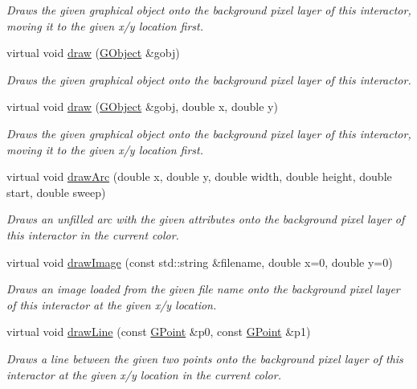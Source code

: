 \begin{DoxyCompactItemize}
\begin{DoxyCompactList}\small\item\em Draws the given graphical object onto the background pixel layer of this interactor, moving it to the given x/y location first. \end{DoxyCompactList}\item 
virtual void \mbox{\hyperlink{classGDrawingSurface_a022a8d51c7fabcd79a0c809233e93453}{draw}} (\mbox{\hyperlink{classGObject}{G\+Object}} \&gobj)
\begin{DoxyCompactList}\small\item\em Draws the given graphical object onto the background pixel layer of this interactor. \end{DoxyCompactList}\item 
virtual void \mbox{\hyperlink{classGDrawingSurface_a8af8762bd6720e0a1d2a84b190e3dc96}{draw}} (\mbox{\hyperlink{classGObject}{G\+Object}} \&gobj, double x, double y)
\begin{DoxyCompactList}\small\item\em Draws the given graphical object onto the background pixel layer of this interactor, moving it to the given x/y location first. \end{DoxyCompactList}\item 
virtual void \mbox{\hyperlink{classGDrawingSurface_a38b6fae1045191c57092b49905068144}{draw\+Arc}} (double x, double y, double width, double height, double start, double sweep)
\begin{DoxyCompactList}\small\item\em Draws an unfilled arc with the given attributes onto the background pixel layer of this interactor in the current color. \end{DoxyCompactList}\item 
virtual void \mbox{\hyperlink{classGDrawingSurface_abdd4cb1f2c64adc5d03522a1ee30febf}{draw\+Image}} (const std\+::string \&filename, double x=0, double y=0)
\begin{DoxyCompactList}\small\item\em Draws an image loaded from the given file name onto the background pixel layer of this interactor at the given x/y location. \end{DoxyCompactList}\item 
virtual void \mbox{\hyperlink{classGDrawingSurface_ae6a24b6b9a6e795d3165c1c750d5bdf1}{draw\+Line}} (const \mbox{\hyperlink{classGPoint}{G\+Point}} \&p0, const \mbox{\hyperlink{classGPoint}{G\+Point}} \&p1)
\begin{DoxyCompactList}\small\item\em Draws a line between the given two points onto the background pixel layer of this interactor at the given x/y location in the current color. \end{DoxyCompactList}\item 

\end{DoxyCompactItemize}
